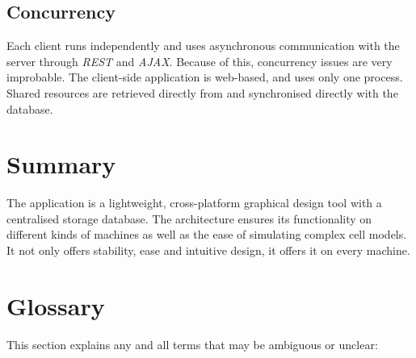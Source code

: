 \documentclass{report}
\begin{document}
		\subsection{Concurrency}
			Each client runs independently and uses asynchronous communication with the server through \emph{REST} and \emph{AJAX}. Because of this, concurrency issues are very improbable. The client-side application is web-based, and uses only one process. Shared resources are retrieved directly from and synchronised directly with the database.
	\clearpage
	\section{Summary}
		The application is a lightweight, cross-platform graphical design tool with a centralised storage database. The architecture ensures its functionality on different kinds of machines as well as the ease of simulating complex cell models. It not only offers stability, ease and intuitive design, it offers it on every machine.
	\section{Glossary}
		This section explains any and all terms that may be ambiguous or unclear:\\
\end{document}
